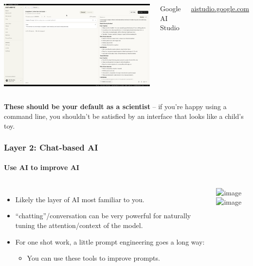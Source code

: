 \documentclass[aspectratio=169]{beamer}
\begin{document}
\begin{frame}
\begin{columns}
        \centering
        \includegraphics[width=\textwidth]{figures/gemini_dev_screenshot.png}
        
        Google AI Studio
        
        \url{aistudio.google.com}
    \end{columns}
    
    \vspace{0.3cm}
    
    \textbf{These should be your default as a scientist} -- if you're happy using a command line, you shouldn't be satisfied by an interface that looks like a child's toy.
\end{frame}

\begin{frame}
    \frametitle{Layer 2: Chat-based AI}
    \framesubtitle{Use AI to improve AI}
    \begin{columns}
        \begin{itemize}
            \item Likely the layer of AI most familiar to you.
            \item ``chatting''/conversation can be very powerful for naturally tuning the attention/context of the model.
            \item For one shot work, a little prompt engineering goes a long way:
                \begin{itemize}
                    \item You can use these tools to improve prompts.
                \end{itemize}
        \end{itemize}
        \includegraphics<1>[width=\textwidth]{figures/prompt_demo1.png}%
        \includegraphics<2>[width=\textwidth]{figures/prompt_demo2.png}
    \end{columns}
\end{frame}
\end{document}
